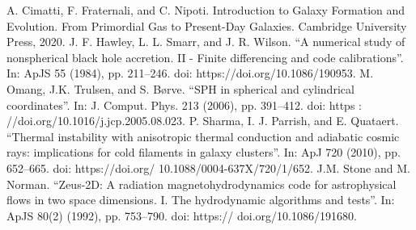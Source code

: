 \documentclass{article}
\begin{document}
\begin{thebibliography}{5}
	A. Cimatti, F. Fraternali, and C. Nipoti. Introduction to Galaxy Formation and Evolution.
From Primordial Gas to Present-Day Galaxies. Cambridge University Press, 2020.
	J. F. Hawley, L. L. Smarr, and J. R. Wilson. “A numerical study of nonspherical
black hole accretion. II - Finite differencing and code calibrations”. In: ApJS
55 (1984), pp. 211–246. doi: https://doi.org/10.1086/190953.
M. Omang, J.K. Trulsen, and S. Børve. “SPH in spherical and cylindrical
coordinates”. In: J. Comput. Phys. 213 (2006), pp. 391–412. doi: https :
//doi.org/10.1016/j.jcp.2005.08.023.
P. Sharma, I. J. Parrish, and E. Quataert. “Thermal instability with anisotropic
thermal conduction and adiabatic cosmic rays: implications for cold filaments
in galaxy clusters”. In: ApJ 720 (2010), pp. 652–665. doi: https://doi.org/
10.1088/0004-637X/720/1/652.
J.M. Stone and M. Norman. “Zeus-2D: A radiation magnetohydrodynamics
code for astrophysical flows in two space dimensions. I. The hydrodynamic
algorithms and tests”. In: ApJS 80(2) (1992), pp. 753–790. doi: https://
doi.org/10.1086/191680.
\end{thebibliography}
\end{document}

